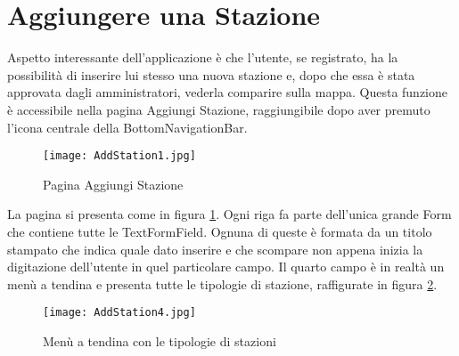 \section{Aggiungere una Stazione}
Aspetto interessante dell'applicazione è che l'utente, se registrato, ha la
possibilità di inserire lui stesso una nuova stazione e, dopo che essa è stata
approvata dagli amministratori, vederla comparire sulla mappa. Questa funzione è accessibile nella
pagina Aggiungi Stazione, raggiungibile dopo aver premuto l'icona centrale della
BottomNavigationBar. 
\begin{figure}[!h]
    \centering
    \texttt{[image: AddStation1.jpg]}
    \caption{Pagina Aggiungi Stazione}
    \label{addStation1}
\end{figure}
La pagina si presenta come in figura \ref{addStation1}. Ogni riga fa parte
dell'unica grande Form che contiene tutte le TextFormField. Ognuna di queste è
formata da un titolo stampato che indica quale dato inserire e che scompare non
appena inizia la digitazione dell'utente in quel particolare campo. 
Il quarto campo è in realtà un menù a tendina e presenta tutte le tipologie di
stazione, raffigurate in figura \ref{addStation4}.
\begin{figure}[!h]
    \centering
    \texttt{[image: AddStation4.jpg]}
    \caption{Menù a tendina con le tipologie di stazioni}
    \label{addStation4}
\end{figure}

